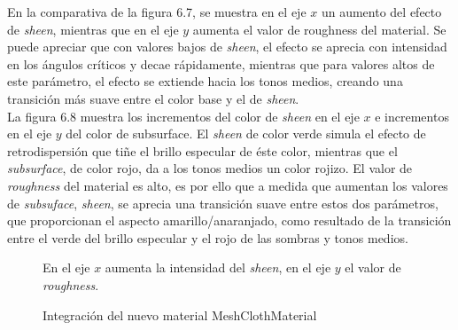 En la comparativa de la figura 6.7, se muestra en el eje $x$ un aumento del efecto de \textit{sheen}, mientras que en el
eje $y$ aumenta el valor de roughness del material. Se puede apreciar que con valores bajos de \textit{sheen}, el efecto
se aprecia con intensidad en los \'angulos cr\'iticos y decae r\'apidamente, mientras que para valores altos de este par\'ametro,
el efecto se extiende hacia los tonos medios, creando una transici\'on m\'as suave entre el color base y el de \textit{sheen}.\\

La figura 6.8 muestra los incrementos del color de \textit{sheen} en el eje $x$ e incrementos en el eje $y$ del color de subsurface.
El \textit{sheen} de color verde simula el efecto de retrodispersi\'on que ti\~ne el brillo especular de \'este color, mientras
que el \textit{subsurface}, de color rojo, da a los tonos medios un color rojizo. El valor de \textit{roughness} del material
es alto, es por ello que a medida que aumentan los valores de \textit{subsuface}, \textit{sheen}, se aprecia una transici\'on
suave entre estos dos par\'ametros, que proporcionan el aspecto amarillo/anaranjado, como resultado de la transici\'on entre
el verde del brillo especular y el rojo de las sombras y tonos medios.

\begin{figure}[H]
  \vspace{0.5cm}
  \centering
    \caption{En el eje $x$ aumenta la intensidad del \textit{sheen}, en el eje $y$ el valor de \textit{roughness}.}
  \vspace{0.5cm}
\end{figure}
\singlespacing

\begin{figure}[H]
  \vspace{0.5cm}
  \centering
  \caption{Integraci\'on del nuevo material MeshClothMaterial}
  \vspace{0.5cm}
\end{figure}
\singlespacing